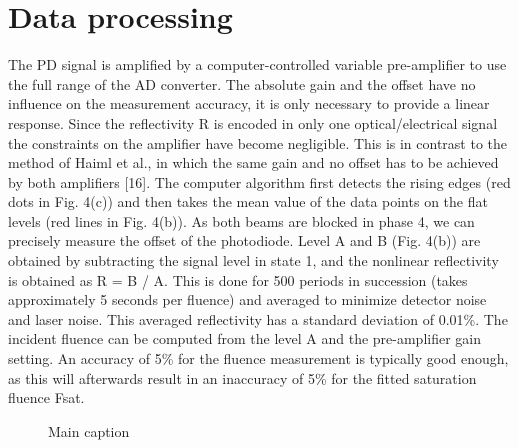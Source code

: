 \section{Data processing}\label{sec:processing}

The PD signal is amplified by a computer-controlled variable pre-amplifier to use the full
range of the AD converter. The absolute gain and the offset have no influence on the
measurement accuracy, it is only necessary to provide a linear response. Since the reflectivity
R is encoded in only one optical/electrical signal the constraints on the amplifier have become
negligible. This is in contrast to the method of Haiml et al., in which the same gain and no
offset has to be achieved by both amplifiers [16].
The computer algorithm first detects the rising edges (red dots in Fig. 4(c)) and then takes
the mean value of the data points on the flat levels (red lines in Fig. 4(b)). As both beams are
blocked in phase 4, we can precisely measure the offset of the photodiode. Level A and B
(Fig. 4(b)) are obtained by subtracting the signal level in state 1, and the nonlinear reflectivity
is obtained as R = B / A. This is done for 500 periods in succession (takes approximately 5
seconds per fluence) and averaged to minimize detector noise and laser noise. This averaged
reflectivity has a standard deviation of 0.01\%. The incident fluence can be computed from the
level A and the pre-amplifier gain setting. An accuracy of 5\% for the fluence measurement is
typically good enough, as this will afterwards result in an inaccuracy of 5\% for the fitted
saturation fluence Fsat.

\begin{figure}[ht]
    \centering
    \caption{Main caption}
\end{figure}